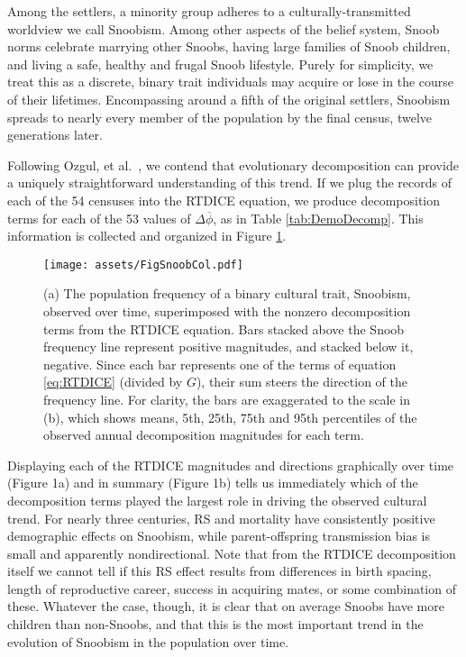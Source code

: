 \documentclass[11pt]{article}
\begin{document}
Among the settlers, a minority group adheres to a culturally-transmitted worldview we call Snoobism.  Among other aspects of the belief system, Snoob norms celebrate marrying other Snoobs, having large families of Snoob children, and living a safe, healthy and frugal Snoob lifestyle.  Purely for simplicity, we treat this as a discrete, binary trait individuals may acquire or lose in the course of their lifetimes.  Encompassing around a fifth of the original settlers, Snoobism spreads to nearly every member of the population by the final census, twelve generations later.  

Following Ozgul, et al.~\citeyearpar{ozgul2009dynamics}, we contend that evolutionary decomposition can provide a uniquely straightforward understanding of this trend.  If we plug the records of each of the 54 censuses into the RTDICE equation, we produce decomposition terms for each of the 53 values of $\Delta \overline{\phi}$, as in Table \ref{tab:DemoDecomp}.  This information is collected and organized in Figure \ref{fig:Snoob}.

\begin{figure}[t]
\begin{center} 
\texttt{[image: assets/FigSnoobCol.pdf]}
\caption{(a) The population frequency of a binary cultural trait, Snoobism, observed over time, superimposed with the nonzero decomposition terms from the RTDICE equation.  Bars stacked above the Snoob frequency line represent positive magnitudes, and stacked below it, negative.  Since each bar represents one of the terms of equation \ref{eq:RTDICE} (divided by $G$), their sum steers the direction of the frequency line.  For clarity, the bars are exaggerated to the scale in (b), which shows means, 5th, 25th, 75th and 95th percentiles of the observed annual decomposition magnitudes for each term.}
\label{fig:Snoob}
\end{center}
\end{figure}

Displaying each of the RTDICE magnitudes and directions graphically over time (Figure 1a) and in summary (Figure 1b) tells us immediately which of the decomposition terms played the largest role in driving the observed cultural trend.  For nearly three centuries, RS and mortality have consistently positive demographic effects on Snoobism, while parent-offspring transmission bias is small and apparently nondirectional.  Note that from the RTDICE decomposition itself we cannot tell if this RS effect results from differences in birth spacing, length of reproductive career, success in acquiring mates, or some combination of these.  Whatever the case, though, it is clear that on average Snoobs have more children than non-Snoobs, and that this is the most important trend in the evolution of Snoobism in the population over time.  
\end{document}
